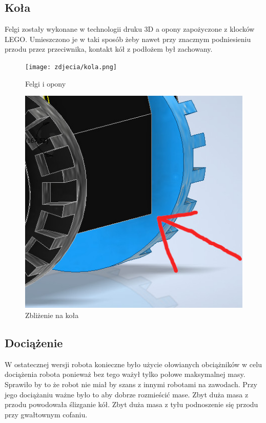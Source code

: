 \documentclass[polish,polish,a4paper]{article}
\begin{document}
   
    \subsection{Koła}
        Felgi zostały wykonane w technologii druku 3D a opony zapożyczone z klocków LEGO. Umieszczono je w taki sposób żeby nawet przy znacznym podniesieniu przodu przez przeciwnika, kontakt kół z podłożem był zachowany.
        
        \begin{figure}[!htb]
       \begin{minipage}{0.3\textwidth}
         \centering
         \texttt{[image: zdjecia/kola.png]}
         \caption{Felgi i opony}\label{Fig:Data1}
       \end{minipage}\hspace{45mm}
       \begin{minipage}{0.3\textwidth}
         \centering
         \includegraphics[width=1.1\linewidth]{photo/Kola.jpg}
         \caption{Zbliżenie na koła}\label{Fig:Data2}
       \end{minipage}
        \end{figure}
        
    \subsection{Dociążenie}
        W ostatecznej wersji robota konieczne było użycie ołowianych obciążników w celu dociążenia robota ponieważ bez tego ważył tylko połowe maksymalnej masy. Sprawiło by to że robot nie miał by szans z innymi robotami na zawodach. Przy jego dociążaniu ważne było to aby dobrze rozmieścić mase. Zbyt duża masa z przodu powodowała ślizganie kół. Zbyt duża masa z tyłu podnoszenie się przodu przy gwałtownym cofaniu.
    
\end{document}
